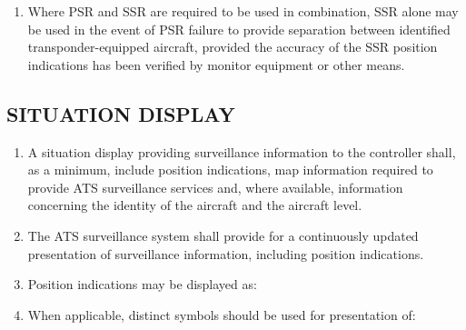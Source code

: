 \documentclass[../main.tex]{subfiles}
\begin{document}
\begin{enumerate}[label=\arabic{section}.\arabic{subsection}.\arabic*]
        \item Where PSR and SSR are required to be used in combination, SSR alone may be used in the event of PSR failure to provide separation between identified transponder-equipped aircraft, provided the accuracy of the SSR position indications has been verified by monitor equipment or other means.
    \end{enumerate}

    \subsection[Situation display]{SITUATION DISPLAY}

    \begin{enumerate}[label=\arabic{section}.\arabic{subsection}.\arabic*]
        \item A situation display providing surveillance information to the controller shall, as a minimum, include position indications, map information required to provide ATS surveillance services and, where available, information concerning the identity of the aircraft and the aircraft level.
        \item The ATS surveillance system shall provide for a continuously updated presentation of surveillance information, including position indications.
        \item Position indications may be displayed as:


        \item When applicable, distinct symbols should be used for presentation of:



\end{enumerate}
\end{document}
